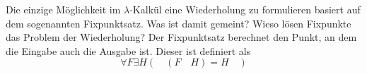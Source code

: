 \begin{card}
  Die einzige Möglichkeit im $\lambda$-Kalkül eine Wiederholung zu formulieren basiert auf dem sogenannten Fixpunktsatz. Was ist damit gemeint? Wieso lösen Fixpunkte das Problem der Wiederholung?
  \hr
  Der Fixpunktsatz berechnet den Punkt, an dem die Eingabe auch die Ausgabe ist. Dieser ist definiert als
  \[
    \forall F \exists H ( \quad (F \quad H) = H \quad )
  \]
\end{card}
